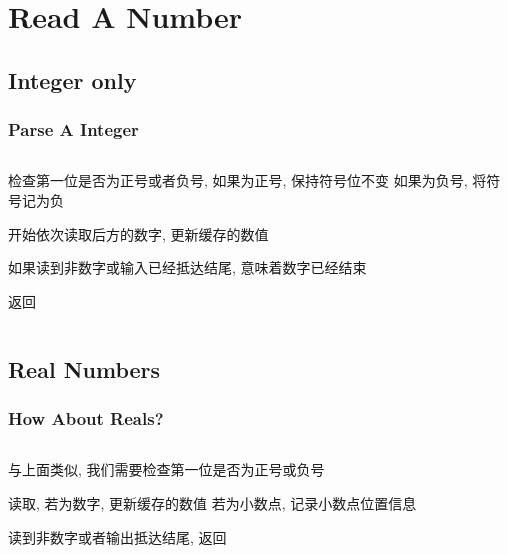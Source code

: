 \documentclass[en, 11pt, xcolor=dvipsnames]{beamer}
\begin{document}
\section{Read A Number}
\subsection{Integer only}
\begin{frame}[fragile]
	\frametitle{Parse A Integer}


	\begin{columns}[c]
		\begin{column}{0.98\textwidth}

			检查第一位是否为正号或者负号, 如果为正号, 保持符号位不变
			如果为负号, 将符号记为负

			开始依次读取后方的数字, 更新缓存的数值

			如果读到非数字或输入已经抵达结尾, 意味着数字已经结束

			返回

		\end{column}
	\end{columns}
\end{frame}

\subsection{Real Numbers}
\begin{frame}[fragile]
	\frametitle{How About Reals?}



	\begin{columns}[c]
		\begin{column}{0.98\textwidth}

			与上面类似,
			我们需要检查第一位是否为正号或负号

			读取, 若为数字, 更新缓存的数值
			若为小数点, 记录小数点位置信息

			读到非数字或者输出抵达结尾, 返回

		\end{column}
	\end{columns}

\end{frame}

\end{document}
